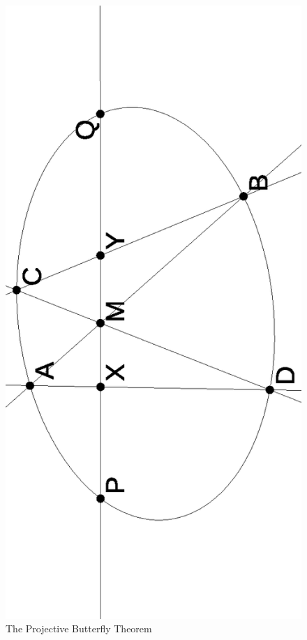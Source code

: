 \documentclass[letterpaper,11pt]{article}
\theoremstyle{definition}
\theoremstyle{remark}
\begin{document}
\begin{figure}[!htb]
\centering
\includegraphics[scale=.5,angle=270]{butterfly.eps}
\caption{The Projective Butterfly Theorem}
\end{figure}
\end{document}
